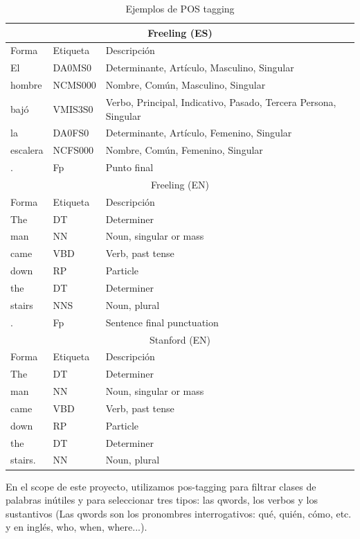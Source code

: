 \begin{center}
\centering
\begin{table}
\begin{tabular}{| l | l | l |}
\hline
\multicolumn{3}{|c|}{Freeling (ES)} \\ \hline
Forma &  Etiqueta & Descripción \\ \hline
El & DA0MS0 & Determinante, Artículo, Masculino, Singular\\ \hline
hombre & NCMS000 & Nombre, Común, Masculino, Singular  \\ \hline
bajó & VMIS3S0 & Verbo, Principal, Indicativo, Pasado, Tercera Persona, Singular\\ \hline
la & DA0FS0 & Determinante, Artículo, Femenino, Singular\\ \hline
escalera& NCFS000 & Nombre, Común, Femenino, Singular \\ \hline
.& Fp& Punto final\\ \hline \hline
\multicolumn{3}{|c|}{Freeling (EN)} \\ \hline
Forma & Etiqueta & Descripción \\ \hline
The &DT & Determiner \\ \hline
man &NN & Noun, singular or mass \\ \hline
came  &VBD& Verb, past tense\\ \hline
down  &RP& Particle \\ \hline
the &DT& Determiner \\ \hline
stairs & NNS& Noun, plural \\ \hline
.& Fp& Sentence final punctuation \\ \hline \hline
\multicolumn{3}{|c|}{Stanford (EN)} \\ \hline
Forma & Etiqueta & Descripción \\ \hline
The &DT & Determiner \\ \hline
 man & NN & Noun, singular or mass \\ \hline
  came &VBD  & Verb, past tense \\ \hline
 down & RP  &  Particle\\ \hline
 the & DT  &  Determiner \\ \hline
 stairs. &NN   & Noun, plural \\ \hline
 \end{tabular}
\caption{Ejemplos de POS tagging}
\label{ejemplos_de_postagging}
\end{table}
\end{center}

En el scope de este proyecto, utilizamos pos-tagging para filtrar clases de palabras inútiles y para seleccionar tres tipos: las qwords, los verbos y los sustantivos (Las qwords son los pronombres interrogativos: qué, quién, cómo, etc. y en inglés, who, when, where...). \newline


